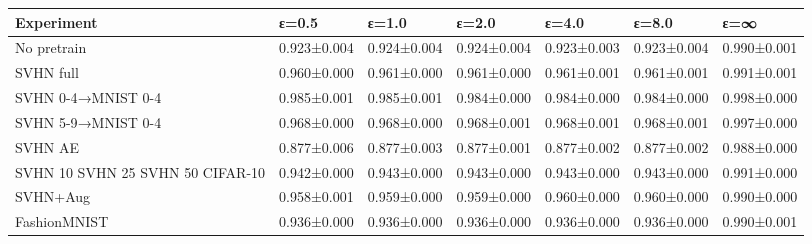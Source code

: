 \begin{tabular}{lllllll}
\toprule
Experiment & ε=0.5 & ε=1.0 & ε=2.0 & ε=4.0 & ε=8.0 & ε=∞ \\
\midrule
No pretrain & 0.923±0.004 & 0.924±0.004 & 0.924±0.004 & 0.923±0.003 & 0.923±0.004 & 0.990±0.001 \\
SVHN full & 0.960±0.000 & 0.961±0.000 & 0.961±0.000 & 0.961±0.001 & 0.961±0.001 & 0.991±0.001 \\
SVHN {0-4}→MNIST {0-4} & 0.985±0.001 & 0.985±0.001 & 0.984±0.000 & 0.984±0.000 & 0.984±0.000 & 0.998±0.000 \\
SVHN {5-9}→MNIST {0-4} & 0.968±0.000 & 0.968±0.000 & 0.968±0.001 & 0.968±0.001 & 0.968±0.001 & 0.997±0.000 \\
SVHN AE & 0.877±0.006 & 0.877±0.003 & 0.877±0.001 & 0.877±0.002 & 0.877±0.002 & 0.988±0.000 \\
SVHN 10%
SVHN 25%
SVHN 50%
CIFAR-10 & 0.942±0.000 & 0.943±0.000 & 0.943±0.000 & 0.943±0.000 & 0.943±0.000 & 0.991±0.000 \\
SVHN+Aug & 0.958±0.001 & 0.959±0.000 & 0.959±0.000 & 0.960±0.000 & 0.960±0.000 & 0.990±0.000 \\
FashionMNIST & 0.936±0.000 & 0.936±0.000 & 0.936±0.000 & 0.936±0.000 & 0.936±0.000 & 0.990±0.001 \\
\bottomrule
\end{tabular}
